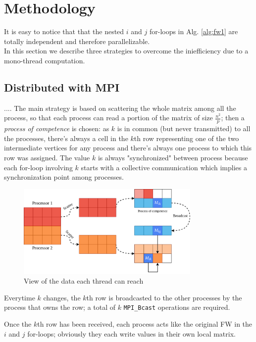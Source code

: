 \section{Methodology}
It is easy to notice that that the nested $i$ and $j$ for-loops in Alg. \ref*{alg:fw1} are totally independent and therefore parallelizable. \\
In this section we describe three strategies to overcome the iniefficiency due to a mono-thread computation.


\subsection{Distributed with MPI}

....
The main strategy is based on scattering the whole matrix among all the process, so that
each process can read a portion of the matrix of size $\frac{n^2}{p}$; then a \emph{process of competence}
is chosen: as $k$ is in common (but never transmitted) to all the processes, there's always a cell in the $k$th
row representing one of the two intermediate vertices for any process and there's always one process to which this row was assigned.
The value $k$ is always "synchronized" between process because each for-loop involving $k$ starts with a collective communication
which implies a synchronization point among processes.

\begin{figure}[h!]
\centering                                                                        
\includegraphics[width=3.5in]{diagrams/mpi-scatter}
\captionsetup{justification=centering}                                                                                                                                   
\caption{View of the data each thread can reach}                                                                                                                                            
\label{fig:threads}                                                                                                                                                           
\end{figure}
Everytime $k$ changes, the $k$th row is broadcasted to the other processes by the process that owns the row;
a total of $k$ \texttt{MPI\_Bcast} operations are required. \par
Once the $k$th row has been received, each process acts like the original FW in the $i$ and $j$ for-loops; obviously
they each write values in their own local matrix. \par

